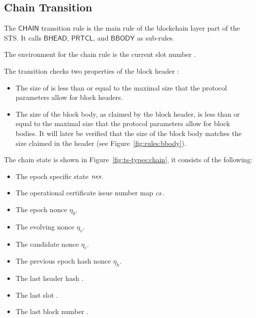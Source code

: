 \clearpage

\subsection{Chain Transition}
\label{sec:chain-trans}

The $\mathsf{CHAIN}$ transition rule is the main rule of the blockchain layer
part of the STS. It calls $\mathsf{BHEAD}$, $\mathsf{PRTCL}$, and $\mathsf{BBODY}$ as sub-rules.

The environment for the chain rule is the current slot number .

The transition checks two properties of the block header :
\begin{itemize}
\item The size of  is less than or equal to the maximal size that the
  protocol parameters allow for block headers.
\item The size of the block body, as claimed by the block header, is less than or equal to the
  maximal size that the protocol parameters allow for block bodies.
  It will later be verified that the size of the block body matches the size claimed
  in the header (see Figure~\ref{fig:rules:bbody}).
\end{itemize}


The chain state is shown in Figure~\ref{fig:ts-types:chain}, it consists of the
following:

\begin{itemize}
  \item The epoch specific state $\mathit{nes}$.
  \item The operational certificate issue number map $\mathit{cs}$.
  \item The epoch nonce $\eta_0$.
  \item The evolving nonce $\eta_v$.
  \item The candidate nonce $\eta_c$.
  \item The previous epoch hash nonce $\eta_h$.
  \item The last header hash .
  \item The last slot .
  \item The last block number .
\end{itemize}

